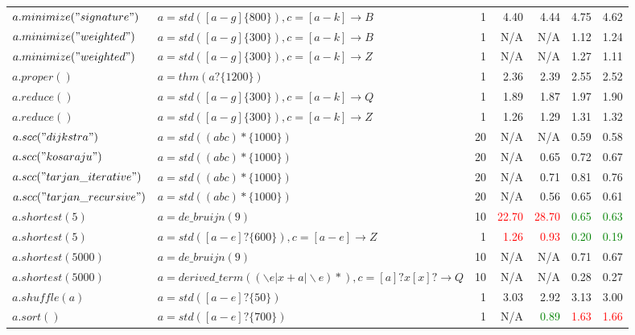 \begin{tabular}{llr *{4}{r}}
$a.minimize("signature")$ & $a = std([a-g]\{800\}), c = [a-k] \rightarrow B$ & 1 & \num{ 4.40} & \num{ 4.44} & \num{ 4.75} & \num{ 4.62} \\
$a.minimize("weighted")$ & $a = std([a-g]\{300\}), c = [a-k] \rightarrow B$ & 1 &   N/A &   N/A & \num{ 1.12} & \num{ 1.24} \\
$a.minimize("weighted")$ & $a = std([a-g]\{300\}), c = [a-k] \rightarrow Z$ & 1 &   N/A &   N/A & \num{ 1.27} & \num{ 1.11} \\
$a.proper()$ & $a = thm(a?\{1200\})$ & 1 & \num{ 2.36} & \num{ 2.39} & \num{ 2.55} & \num{ 2.52} \\
$a.reduce()$ & $a = std([a-g]\{300\}), c = [a-k] \rightarrow Q$ & 1 & \num{ 1.89} & \num{ 1.87} & \num{ 1.97} & \num{ 1.90} \\
$a.reduce()$ & $a = std([a-g]\{300\}), c = [a-k] \rightarrow Z$ & 1 & \num{ 1.26} & \num{ 1.29} & \num{ 1.31} & \num{ 1.32} \\
$a.scc("dijkstra")$ & $a = std((abc)*\{1000\})$ & 20 &   N/A &   N/A & \num{ 0.59} & \num{ 0.58} \\
$a.scc("kosaraju")$ & $a = std((abc)*\{1000\})$ & 20 &   N/A & \num{ 0.65} & \num{ 0.72} & \num{ 0.67} \\
$a.scc("tarjan\_iterative")$ & $a = std((abc)*\{1000\})$ & 20 &   N/A & \num{ 0.71} & \num{ 0.81} & \num{ 0.76} \\
$a.scc("tarjan\_recursive")$ & $a = std((abc)*\{1000\})$ & 20 &   N/A & \num{ 0.56} & \num{ 0.65} & \num{ 0.61} \\
$a.shortest(5)$ & $a = de\_bruijn(9)$ & 10 & \textcolor{red}{\num{22.70}} & \textcolor{red}{\num{28.70}} & \textcolor{green}{\num{ 0.65}} & \textcolor{green}{\num{ 0.63}} \\
$a.shortest(5)$ & $a = std([a-e]?\{600\}), c = [a-e] \rightarrow Z$ & 1 & \textcolor{red}{\num{ 1.26}} & \textcolor{red}{\num{ 0.93}} & \textcolor{green}{\num{ 0.20}} & \textcolor{green}{\num{ 0.19}} \\
$a.shortest(5000)$ & $a = de\_bruijn(9)$ & 10 &   N/A &   N/A & \num{ 0.71} & \num{ 0.67} \\
$a.shortest(5000)$ & $a = derived\_term((\backslash e|x + a|\backslash e)*), c = [a]?x[x]? \rightarrow Q$ & 10 &   N/A &   N/A & \num{ 0.28} & \num{ 0.27} \\
$a.shuffle(a)$ & $a = std([a-e]?\{50\})$ & 1 & \num{ 3.03} & \num{ 2.92} & \num{ 3.13} & \num{ 3.00} \\
$a.sort()$ & $a = std([a-e]?\{700\})$ & 1 &   N/A & \textcolor{green}{\num{ 0.89}} & \textcolor{red}{\num{ 1.63}} & \textcolor{red}{\num{ 1.66}} \\

\end{tabular}
